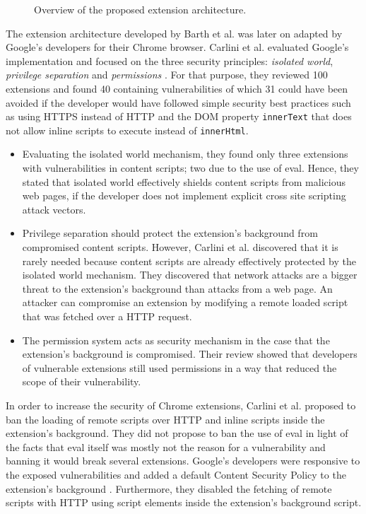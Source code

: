 	\begin{figure}[h]
		\centering
		\def\svgscale{0.8}
		
		\caption{Overview of the proposed extension architecture.}
		\label{fig:barthOverview}
	\end{figure}
	
	The extension architecture developed by Barth et al. was later on adapted by Google's developers for their Chrome browser. Carlini et al. evaluated Google's implementation and focused on the three security principles: \textit{isolated world}, \textit{privilege separation} and \textit{permissions} \cite{Carlini:2012:EGC:2362793.2362800}. For that purpose, they reviewed 100 extensions and found 40 containing vulnerabilities of which 31 could have been avoided if the developer would have followed simple security best practices such as using HTTPS instead of HTTP and the DOM property \texttt{innerText} that does not allow inline scripts to execute instead of \texttt{innerHtml}. 
	
	\begin{itemize}
		\item Evaluating the isolated world mechanism, they found only three extensions with vulnerabilities in content scripts; two due to the use of eval. Hence, they stated that isolated world effectively shields content scripts from malicious web pages, if the developer does not implement explicit cross site scripting attack vectors.
		
		\item Privilege separation should protect the extension's background from compromised content scripts. However, Carlini et al. discovered that it is rarely needed because content scripts are already effectively protected by the isolated world mechanism. They discovered that network attacks are a bigger threat to the extension's background than attacks from a web page. An attacker can compromise an extension by modifying a remote loaded script that was fetched over a HTTP request. 
		
		\item The permission system acts as security mechanism in the case that the extension's background is compromised. Their review showed that developers of vulnerable extensions still used permissions in a way that reduced the scope of their vulnerability. 
	\end{itemize} 

	In order to increase the security of Chrome extensions, Carlini et al. proposed to ban the loading of remote scripts over HTTP and inline scripts inside the extension's background. They did not propose to ban the use of eval in light of the facts that eval itself was mostly not the reason for a vulnerability and banning it would break several extensions. Google's developers were responsive to the exposed vulnerabilities and added a default Content Security Policy to the extension's background \cite{chromiumBlogCSP}. Furthermore, they disabled the fetching of remote scripts with HTTP using script elements inside the extension's background script. 
 
